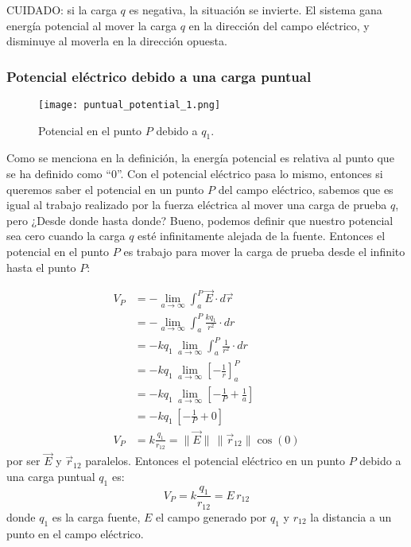 \begin{tcolorbox}[mydanger]
    CUIDADO: si la carga \(q\) es negativa, la situación se invierte. El sistema gana energía potencial al mover la carga \(q\) en la dirección del campo eléctrico, y disminuye al moverla en la dirección opuesta.    
\end{tcolorbox}

\subsubsection{Potencial eléctrico debido a una carga puntual}

\begin{wrapfigure}{l}{0.32\textwidth}
    \centering
    \texttt{[image: puntual\_potential\_1.png]}
    \caption{Potencial en el punto \(P\) debido a \(q_1\).}
    \label{fig:potential_point_charge}
\end{wrapfigure}

Como se menciona en la definición, la energía potencial es relativa al punto que se ha definido como ``0''. Con  el potencial eléctrico pasa lo mismo, entonces si queremos saber el potencial en un punto \(P\) del campo eléctrico, sabemos que es igual al trabajo realizado por la fuerza eléctrica al mover una carga de prueba \(q\), pero ¿Desde donde hasta donde? Bueno, podemos definir que nuestro potencial sea cero cuando la carga \(q\) esté infinitamente alejada de la fuente. Entonces el potencial en el punto \(P\) es trabajo para mover la carga de prueba desde el infinito hasta el punto \(P\):

\begin{align*}
    V_P &= - \lim_{a \to \infty}\int_{a}^P \vec{E} \cdot d\vec{r}\\
        &= - \lim_{a \to \infty}\int_{a}^P \frac{kq_1}{r^2} \cdot dr\\
        &= -kq_1 \, \lim_{a \to \infty} \int_{a}^P \frac{1}{r^2} \cdot dr\\
        &= -kq_1 \, \lim_{a \to \infty} \left[ -\frac{1}{r} \right]_{a}^P\\
        &= -kq_1 \, \lim_{a \to \infty} \left[ -\frac{1}{P} + \frac{1}{a} \right]\\
        &= -kq_1 \, \left[ -\frac{1}{P} + 0 \right] \\
    V_P &= k\frac{q_1}{r_{12}} = \lVert\vec{E}\rVert \, \lVert\vec{r}_{12}\rVert \cos(0)
\end{align*}
por ser \(\vec{E}\) y \(\vec{r}_{12}\) paralelos. Entonces el potencial eléctrico en un punto \(P\) debido a una carga puntual \(q_1\) es:
\begin{equation}
    \boxed{V_P = k\frac{q_1}{r_{12}} = E \, r_{12}}
    \label{eq:potential_point_charge}
\end{equation}
donde \(q_1\) es la carga fuente, \(E\) el campo generado por \(q_1\) y \(r_{12}\) la distancia a un punto en el campo eléctrico.

